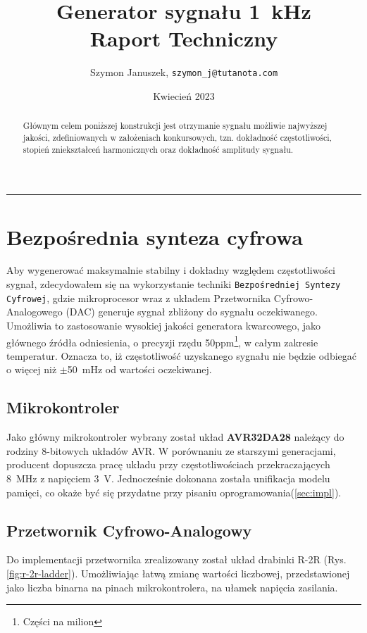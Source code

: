 \documentclass[12pt, a4paper]{article}
\title{
	Generator sygnału \qty{1}{\kHz}\\
	\large Raport Techniczny
}
\author{Szymon Januszek, \texttt{szymon\_j@tutanota.com}}
\date{Kwiecień 2023}
\begin{document}
\normalfont
{}
\maketitle
\hrule

\begin{abstract}
	Głównym celem poniższej konstrukcji jest otrzymanie sygnału możliwie najwyższej jakości, 
	zdefiniowanych w założeniach konkursowych, tzn. dokładność częstotliwości, stopień zniekształceń harmonicznych 
	oraz dokładność amplitudy sygnału.
\end{abstract}


\newpage

\tableofcontents

\newpage

\section{Bezpośrednia synteza cyfrowa}

Aby wygenerować maksymalnie stabilny i dokładny względem częstotliwości sygnał, 
zdecydowałem się na wykorzystanie techniki \verb|Bezpośredniej Syntezy Cyfrowej|, 
gdzie mikroprocesor wraz z układem Przetwornika Cyfrowo-Analogowego (DAC) generuje sygnał zbliżony do sygnału oczekiwanego. 
Umożliwia to zastosowanie wysokiej jakości generatora kwarcowego, 
jako głównego źródła odniesienia, o precyzji rzędu 50ppm\footnote{Części na milion}, 
w całym zakresie temperatur. Oznacza to, iż częstotliwość uzyskanego sygnału nie będzie odbiegać o więcej niż $\pm$\qty{50}{\mHz} od wartości oczekiwanej. 

\subsection{Mikrokontroler}
Jako główny mikrokontroler wybrany został układ \textbf{AVR32DA28}\cite{avr-datasheet} należący do rodziny 8-bitowych układów AVR.
W porównaniu ze starszymi generacjami, producent dopuszcza pracę układu przy częstotliwościach przekraczających \qty{8}{\MHz} z napięciem \qty{3}{\volt}.
Jednocześnie dokonana została unifikacja modelu pamięci, co okaże być się przydatne przy pisaniu oprogramowania(\ref{sec:impl}).

\subsection{Przetwornik Cyfrowo-Analogowy}
Do implementacji przetwornika zrealizowany został układ drabinki R-2R (Rys.\ref{fig:r-2r-ladder}).
Umożliwiając łatwą zmianę wartości liczbowej, przedstawionej jako liczba binarna na pinach mikrokontrolera, 
na ułamek napięcia zasilania.
\end{document}
